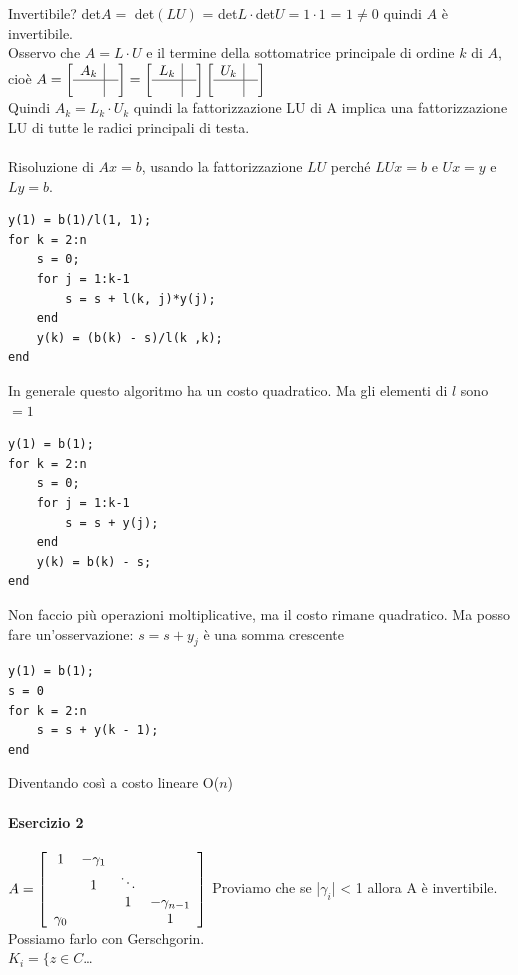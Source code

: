 \documentclass[10pt]{book}
\begin{document}
Invertibile? det$A =$ det$(LU)$ = det$L\cdot$det$U = 1 \cdot 1$ = $1 \neq 0$ quindi $A$ è invertibile.\\
Osservo che $A = L \cdot U$ e il termine della sottomatrice principale di ordine $k$ di $A$, cioè \begin{math}
A = \left[
\begin{array}{c | c}
	A_k & \\
	\hline
	&
\end{array}
\right]
= \left[
\begin{array}{c | c}
	L_k & \\
	\hline
	&
\end{array}
\right]
\left[
\begin{array}{c | c}
	U_k & \\
	\hline
	&
\end{array}
\right]
\end{math}\\
Quindi $A_k = L_k\cdot U_k$ quindi la fattorizzazione LU di A implica una fattorizzazione LU di tutte le radici principali di testa.\\\\
Risoluzione di $Ax = b$, usando la fattorizzazione $LU$ perché $LUx = b$ e $Ux = y$ e $Ly = b$.
\begin{lstlisting}
y(1) = b(1)/l(1, 1);
for k = 2:n
	s = 0;
	for j = 1:k-1
		s = s + l(k, j)*y(j);
	end
	y(k) = (b(k) - s)/l(k ,k);
end
\end{lstlisting}
In generale questo algoritmo ha un costo quadratico. Ma gli elementi di $l$ sono $= 1$
\begin{lstlisting}
y(1) = b(1);
for k = 2:n
	s = 0;
	for j = 1:k-1
		s = s + y(j);
	end
	y(k) = b(k) - s;
end
\end{lstlisting}
Non faccio più operazioni moltiplicative, ma il costo rimane quadratico. Ma posso fare un'osservazione: $s = s + y_j$ è una somma crescente
\begin{lstlisting}
y(1) = b(1);
s = 0
for k = 2:n
	s = s + y(k - 1);
end
\end{lstlisting}
Diventando così a costo lineare O($n$)
\paragraph{Esercizio 2} 
\begin{math}
A = \left[
\begin{array}{c c c c}
	1 & - \gamma_1 & & \\
	& 1 & \ddots & \\
	& & 1 & -\gamma_{n-1} \\
	\gamma_0 & & & 1\\
\end{array}
\right]
\end{math}
Proviamo che se |$\gamma_i$| < 1 allora A è invertibile. Possiamo farlo con Gerschgorin.\\
$K_i = \{ z \in C$\ldots\\
\end{document}
